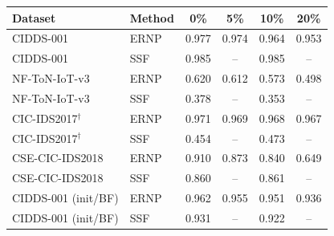 \begin{tabular}{llcccc}
\toprule
Dataset & Method & 0\% & 5\% & 10\% & 20\%\\
\midrule
CIDDS-001 & ERNP & 0.977 & 0.974 & 0.964 & 0.953\\
CIDDS-001 & SSF & 0.985 & -- & 0.985 & --\\
NF-ToN-IoT-v3 & ERNP & 0.620 & 0.612 & 0.573 & 0.498\\
NF-ToN-IoT-v3 & SSF & 0.378 & -- & 0.353 & --\\
CIC-IDS2017$^\dagger$ & ERNP & 0.971 & 0.969 & 0.968 & 0.967\\
CIC-IDS2017$^\dagger$ & SSF & 0.454 & -- & 0.473 & --\\
CSE-CIC-IDS2018 & ERNP & 0.910 & 0.873 & 0.840 & 0.649\\
CSE-CIC-IDS2018 & SSF & 0.860 & -- & 0.861 & --\\
CIDDS-001 (init/BF) & ERNP & 0.962 & 0.955 & 0.951 & 0.936\\
CIDDS-001 (init/BF) & SSF & 0.931 & -- & 0.922 & --\\
\bottomrule
\end{tabular}
